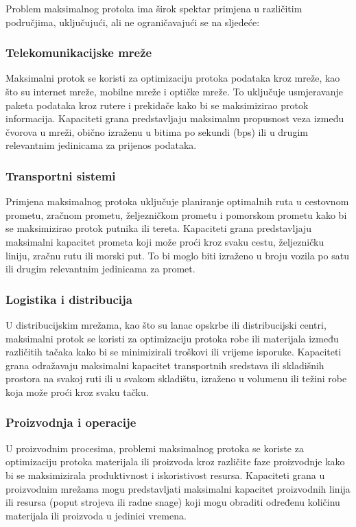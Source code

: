 \documentclass[11pt, a4paper]{article}
\begin{document}
	Problem maksimalnog protoka ima širok spektar primjena u različitim područjima, uključujući, ali ne ograničavajući se na sljedeće:
	
	\subsubsection*{Telekomunikacijske mreže}
	
	Maksimalni protok se koristi za optimizaciju protoka podataka kroz mreže, kao što su internet mreže, mobilne mreže i optičke mreže. To uključuje usmjeravanje paketa podataka kroz rutere i prekidače kako bi se maksimizirao protok informacija. Kapaciteti grana predstavljaju maksimalnu propusnost veza između čvorova u mreži, obično izraženu u bitima po sekundi (bps) ili u drugim relevantnim jedinicama za prijenos podataka.
	
	\subsubsection*{Transportni sistemi}
	
	Primjena maksimalnog protoka uključuje planiranje optimalnih ruta u cestovnom prometu, zračnom prometu, željezničkom prometu i pomorskom prometu kako bi se maksimizirao protok putnika ili tereta. Kapaciteti grana predstavljaju maksimalni kapacitet prometa koji može proći kroz svaku cestu, željezničku liniju, zračnu rutu ili morski put. To bi moglo biti izraženo u broju vozila po satu ili drugim relevantnim jedinicama za promet.
	
	\subsubsection*{Logistika i distribucija}
	
	U distribucijskim mrežama, kao što su lanac opskrbe ili distribucijski centri, maksimalni protok se koristi za optimizaciju protoka robe ili materijala između različitih tačaka kako bi se minimizirali troškovi ili vrijeme isporuke. Kapaciteti grana odražavaju maksimalni kapacitet transportnih sredstava ili skladišnih prostora na svakoj ruti ili u svakom skladištu, izraženo u volumenu ili težini robe koja može proći kroz svaku tačku.
	
	\subsubsection*{Proizvodnja i operacije}
	
	U proizvodnim procesima, problemi maksimalnog protoka se koriste za optimizaciju protoka materijala ili proizvoda kroz različite faze proizvodnje kako bi se maksimizirala produktivnost i iskoristivost resursa. Kapaciteti grana u proizvodnim mrežama mogu predstavljati maksimalni kapacitet proizvodnih linija ili resursa (poput strojeva ili radne snage) koji mogu obraditi određenu količinu materijala ili proizvoda u jedinici vremena.
	
\end{document}
